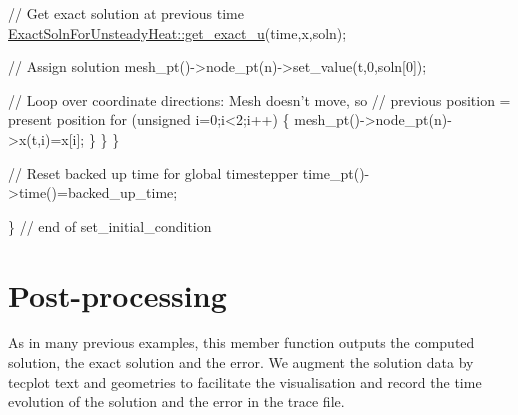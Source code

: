 \begin{DoxyCodeInclude}
     \textcolor{comment}{// Get exact solution at previous time}
     \hyperlink{namespaceExactSolnForUnsteadyHeat_a1d5b22857bd2a7825397daf1cf9c89eb}{ExactSolnForUnsteadyHeat::get\_exact\_u}(time,x,soln);
     
     \textcolor{comment}{// Assign solution}
     mesh\_pt()->node\_pt(n)->set\_value(t,0,soln[0]);
     
     \textcolor{comment}{// Loop over coordinate directions: Mesh doesn't move, so }
     \textcolor{comment}{// previous position = present position}
     \textcolor{keywordflow}{for} (\textcolor{keywordtype}{unsigned} i=0;i<2;i++)
      \{
       mesh\_pt()->node\_pt(n)->x(t,i)=x[i];
      \}
    \} 
  \}

 \textcolor{comment}{// Reset backed up time for global timestepper}
 time\_pt()->time()=backed\_up\_time;

\} \textcolor{comment}{// end of set\_initial\_condition}

\end{DoxyCodeInclude}




 

\hypertarget{index_doc}{}\section{Post-\/processing}\label{index_doc}
As in many previous examples, this member function outputs the computed solution, the exact solution and the error. We augment the solution data by tecplot text and geometries to facilitate the visualisation and record the time evolution of the solution and the error in the trace file.


